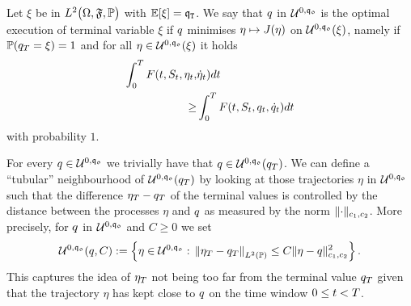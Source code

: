 \documentclass[10pt,a4paper]{article}
\begin{document}
\begin{defi}\label{defi.optimalExecutionOfSpecifiedTerminalVariable}
Let $\xi$ be in $\Ltwo \probabilitySpace$ with $\Expectation[\xi] = \liquidationTarget$. We say that $\inventory$ in $\spaceUnbiasedInventoryTrajectoriesInitialConstraint$ is the optimal execution of terminal variable $\xi$ if $\inventory$ minimises $\eta \mapsto \costFunctional(\eta)$ on $\spaceUnbiasedInventoryTrajectoriesInitialConstraint(\xi)$, namely if $ \Prob(\inventory_\timeHorizon =\xi)=1 $ and for all $\eta \in \spaceUnbiasedInventoryTrajectoriesInitialConstraint(\xi)$ it holds
\begin{equation*}
\begin{split}
\intZeroTimeHorizon F(t,\fundamentalPrice_t,\eta_t,&\dotEta_t )dt \\
\geq & \intZeroTimeHorizon F(t,\fundamentalPrice_t, \inventory_t ,\inventoryRate_t )dt
\end{split}
\end{equation*}
with probability $1$.
\end{defi}
For every $\inventory \in \spaceUnbiasedInventoryTrajectoriesInitialConstraint$ we trivially have that $\inventory \in \spaceUnbiasedInventoryTrajectoriesInitialConstraint(\inventory_\timeHorizon)$. We can define a ``tubular'' neighbourhood of $\spaceUnbiasedInventoryTrajectoriesInitialConstraint(\inventory_\timeHorizon) $ by looking at those trajectories $\eta$ in $\spaceUnbiasedInventoryTrajectoriesInitialConstraint$ such that the difference $\eta_\timeHorizon - \inventory_\timeHorizon$ of the terminal values is controlled by the distance between the processes $\eta$ and $\inventory$ as measured by the norm $\normInventoryTrjectories{\cdot}$. More precisely, for $\inventory$ in $\spaceUnbiasedInventoryTrajectoriesInitialConstraint$ and $C\geq 0$ we set 
\begin{equation}\label{eq.staticTubularNeighbourhoodIC}
\spaceUnbiasedInventoryTrajectoriesInitialConstraint(\inventory,C):=
\left\lbrace
\eta \in \spaceUnbiasedInventoryTrajectoriesInitialConstraint: \, 
\norm[\eta_\timeHorizon-\inventory_\timeHorizon ]_{\Ltwo(\Prob)} \leq 
C \normInventoryTrjectories{\eta -\inventory}\squared 
\right\rbrace.
\end{equation}
This captures the idea of $\eta_\timeHorizon$ not being too far from the terminal value $\inventory_\timeHorizon$ given that the trajectory $\eta$  has kept close to $\inventory$ on the time window $0\leq t<\timeHorizon$.
\end{document}
